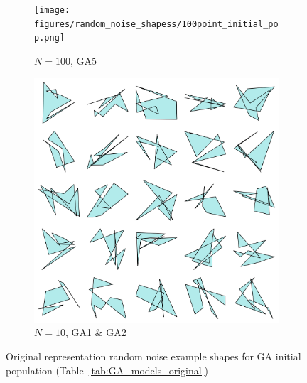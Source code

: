 \documentclass{article}
\begin{document}
\begin{figure}[h]
    \centering
    \begin{subfigure}[b]{0.45\textwidth}
        \centering
        \texttt{[image: figures/random\_noise\_shapess/100point\_initial\_pop.png]}
        \caption{$N=100$, GA5}
        \label{fig:high_res_noise_100}
    \end{subfigure}
    \hfill
    \begin{subfigure}[b]{0.45\textwidth}
        \centering
        \includegraphics[width=\textwidth]{figures/random_noise_shapess/10point_initial_pop.png}
        \caption{$N=10$, GA1 \& GA2}
        \label{fig:high_res_noise_10}
    \end{subfigure}
    \caption{Original representation random noise example shapes for GA initial population (Table~\ref{tab:GA_models_original})}
    \label{fig:random_noise_ga_shapes}
\end{figure}
\end{document}
